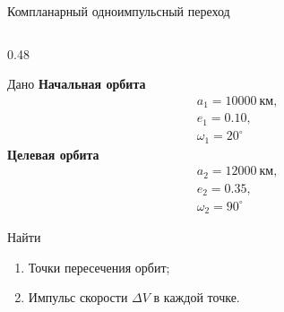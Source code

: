 \documentclass[9pt]{beamer}
\begin{document}
\begin{frame}{Компланарный одноимпульсный переход}
\begin{columns}[T,totalwidth=\textwidth]
  \begin{column}{0.48\textwidth}
    \begin{block}{Дано}
      \textbf{Начальная орбита}
      \begin{equation*}
          \begin{aligned}
            &a_1 = 10000~\text{км},\\
            &e_1 = 0.10,\\
            &\omega_1 = 20^{\circ}
          \end{aligned}
      \end{equation*}
      \medskip
      \textbf{Целевая орбита}
      \begin{equation*}
          \begin{aligned}
            &a_2 = 12000~\text{км},\\
            &e_2 = 0.35,\\
            &\omega_2 = 90^{\circ}
          \end{aligned}
      \end{equation*}
    \end{block}

    \begin{alertblock}{Найти}
      \begin{enumerate}[1)]
        \item Точки пересечения орбит;
        \item Импульс скорости $\Delta V$ в каждой точке.
      \end{enumerate}
    \end{alertblock}
  \end{column}


\end{columns}
\end{frame}
\end{document}
